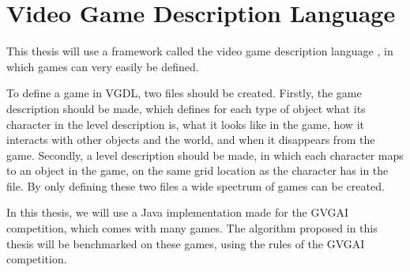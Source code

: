 \section{Video Game Description Language}
\label{subsec:vgdl}
This thesis will use a framework called the video game description
language \cite{schaul2013video}, in which games can very easily be defined.

To define a game in VGDL, two files should be created. Firstly, the game
description should be made, which defines for each type of object what its
character in the level description is, what it looks like in the game, how it
interacts with other objects and the world, and when it disappears from the
game. Secondly, a level description should be made, in which each character maps
to an object in the game, on the same grid location as the character has in the
file. By only defining these two files a wide spectrum of games can be created.

In this thesis, we will use a Java implementation made for the GVGAI competition,
which comes with many games. The algorithm proposed in this thesis will be
benchmarked on these games, using the rules of the GVGAI competition. 
